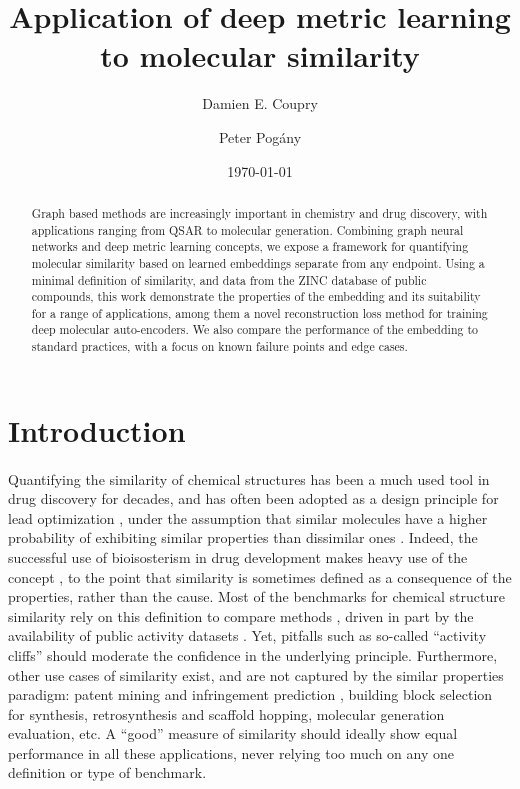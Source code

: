 \documentclass[journal=jacsat,manuscript=article]{achemso}
\author{Damien E. Coupry}
\affiliation[GlaxoSmithKline]
{GlaxoSmithKline, Data and Computational Sciences, UK}
\author{Peter Pog\'{a}ny}
\affiliation[GlaxoSmithKline]
{GlaxoSmithKline, Data and Computational Sciences, UK}
\title{Application of deep metric learning to molecular  similarity}
\date{\today}
\begin{document}
\maketitle

\begin{abstract}
Graph based methods are increasingly important in chemistry and drug discovery, with applications ranging from QSAR to molecular generation. Combining graph neural networks and deep metric learning concepts, we expose a framework for quantifying molecular similarity based on learned embeddings separate from any endpoint. Using a minimal definition of similarity, and data from the ZINC database of public compounds, this work demonstrate the  properties of the embedding and its suitability for a range of applications, among them a novel reconstruction loss method for training deep molecular auto-encoders. We also compare the performance of the embedding to standard practices, with a focus on known failure points and edge cases.
\end{abstract}

\section{Introduction}
\paragraph{}
Quantifying the similarity of chemical structures has been a much used tool in drug discovery for decades\cite{willett1998chemical}, and has often been adopted as a design principle for lead optimization \cite{kubinyi1998similarity, maggiora2014molecular}, under the assumption that similar molecules have a higher probability of exhibiting similar properties than dissimilar ones \cite{johnson1990concepts, patterson1996neighborhood, martin2002structurally}. Indeed, the successful use of bioisosterism in drug development makes heavy use of the concept  \cite{patani1996bioisosterism, lima2005bioisosterism}, to the point that similarity is sometimes defined as a consequence of the properties, rather than the cause\cite{bender2004molecular}. Most of the benchmarks for chemical structure similarity rely on this definition to compare methods \cite{irwin2008community, rohrer2009maximum, riniker2013open}, driven in part by the availability of public activity datasets \cite{gaulton2012chembl}. Yet, pitfalls such as so-called ``activity cliffs''\cite{maggiora2006outliers, stumpfe2012exploring, stumpfe2014recent} should moderate the confidence in the underlying principle. Furthermore, other use cases of similarity exist, and are not captured by the similar properties paradigm: patent mining and infringement prediction \cite{rhodes2007mining}, building block selection for synthesis, retrosynthesis and scaffold hopping\cite{bohm2004scaffold, boehm2008similarity, coley2017computer}, molecular generation evaluation\cite{mendez2020novo}, etc. A ``good'' measure of similarity should ideally show equal performance in all these applications, never relying too much on any one definition or type of benchmark.
\end{document}
